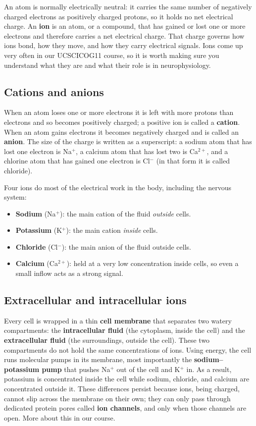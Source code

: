 An atom is normally electrically neutral: it carries the same number of
negatively charged electrons as positively charged protons, so it holds no net
electrical charge. An \textbf{ion} is an atom, or a compound, that has gained
or lost one or more electrons and therefore carries a net electrical
charge. That charge governs how ions bond, how they move, and how they carry
electrical signals. Ions come up very often in our UCSCICOG11 course, so it is
worth making sure you understand what they are and what their role is in neurophysiology.

\subsection{Cations and anions}
When an atom loses one or more electrons it is left with more protons than
electrons and so becomes positively charged; a positive ion is called a
\textbf{cation}. When an atom gains electrons it becomes negatively charged and
is called an \textbf{anion}. The size of the charge is written as a superscript:
a sodium atom that has lost one electron is Na$^{+}$, a calcium atom that has
lost two is Ca$^{2+}$, and a chlorine atom that has gained one electron is
Cl$^{-}$ (in that form it is called chloride).

Four ions do most of the electrical work in the body, including the nervous system:
\begin{itemize}
  \item \textbf{Sodium} (Na$^{+}$): the main cation of the fluid
    \emph{outside} cells.
  \item \textbf{Potassium} (K$^{+}$): the main cation \emph{inside} cells.
  \item \textbf{Chloride} (Cl$^{-}$): the main anion of the fluid outside
    cells.
  \item \textbf{Calcium} (Ca$^{2+}$): held at a very low concentration inside
    cells, so even a small inflow acts as a strong signal.
\end{itemize}

\subsection{Extracellular and intracellular ions}
Every cell is wrapped in a thin \textbf{cell membrane} that separates two watery
compartments: the \textbf{intracellular fluid} (the cytoplasm, inside the cell)
and the \textbf{extracellular fluid} (the surroundings, outside the cell). These
two compartments do not hold the same concentrations of ions. Using energy, the
cell runs molecular pumps in its membrane, most importantly the
\textbf{sodium--potassium pump} that pushes Na$^{+}$ out of the cell and
K$^{+}$ in. As a result, potassium is concentrated inside the cell while sodium,
chloride, and calcium are concentrated outside it. These differences persist
because ions, being charged, cannot slip across the membrane on their own; they
can only pass through dedicated protein pores called \textbf{ion channels}, and
only when those channels are open. More about this in our course.

